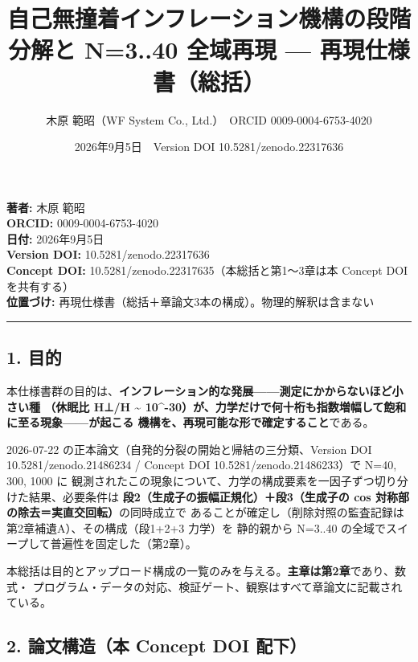 \documentclass[
  a4paper,
]{ltjsarticle}
\title{自己無撞着インフレーション機構の段階分解と N=3..40 全域再現 ---
再現仕様書（総括）}
\author{木原 範昭（WF System Co., Ltd.）　ORCID 0009-0004-6753-4020}
\date{2026年9月5日　Version DOI 10.5281/zenodo.22317636}
\begin{document}
\maketitle

\textbf{著者:} 木原 範昭\\
\textbf{ORCID:} 0009-0004-6753-4020\\
\textbf{日付:} 2026年9月5日\\
\textbf{Version DOI:} 10.5281/zenodo.22317636\\
\textbf{Concept DOI:} 10.5281/zenodo.22317635（本総括と第1〜3章は本
Concept DOI を共有する）\\
\textbf{位置づけ:}
再現仕様書（総括＋章論文3本の構成）。物理的解釈は含まない

\begin{center}\rule{0.5\linewidth}{0.5pt}\end{center}

\subsection{1. 目的}\label{ux76eeux7684}

本仕様書群の目的は、\textbf{インフレーション的な発展------測定にかからないほど小さい種
（休眠比 H⊥/H \textasciitilde{}
10\^{}-30）が、力学だけで何十桁も指数増幅して飽和に至る現象------が起こる
機構を、再現可能な形で確定すること}である。

2026-07-22 の正本論文（自発的分裂の開始と帰結の三分類、Version DOI
10.5281/zenodo.21486234 / Concept DOI 10.5281/zenodo.21486233）で N=40,
300, 1000 に
観測されたこの現象について、力学の構成要素を一因子ずつ切り分けた結果、必要条件は
\textbf{段2（生成子の振幅正規化）＋段3（生成子の cos
対称部の除去＝実直交回転）}の同時成立で
あることが確定し（削除対照の監査記録は第2章補遺A）、その構成（段1+2+3
力学）を 静的親から N=3..40
の全域でスイープして普遍性を固定した（第2章）。

本総括は目的とアップロード構成の一覧のみを与える。\textbf{主章は第2章}であり、数式・
プログラム・データの対応、検証ゲート、観察はすべて章論文に記載されている。

\subsection{2. 論文構造（本 Concept DOI
配下）}\label{ux8ad6ux6587ux69cbux9020ux672c-concept-doi-ux914dux4e0b}
\end{document}
